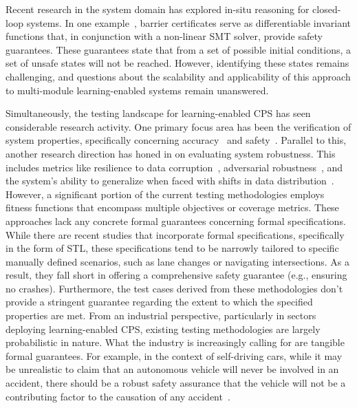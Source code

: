 Recent research in the system domain has explored in-situ reasoning for closed-loop systems. In one example~\cite{tuncali2018reasoning}, barrier certificates serve as differentiable invariant functions that, in conjunction with a non-linear SMT solver, provide safety guarantees. These guarantees state that from a set of possible initial conditions, a set of unsafe states will not be reached. However, identifying these states remains challenging, and questions about the scalability and applicability of this approach to multi-module learning-enabled systems remain unanswered. 

Simultaneously, the testing landscape for learning-enabled CPS has seen considerable research activity. One primary focus area has been the verification of system properties, specifically concerning accuracy~\cite{deng2022declarative} and safety~\cite{tian2022mosat,li2020av}. Parallel to this, another research direction has honed in on evaluating system robustness. This includes metrics like resilience to data corruption~\cite{tian2018deeptest}, adversarial robustness~\cite{deng2020analysis}, and the system's ability to generalize when faced with shifts in data distribution~\cite{cai2020real}.
However, a significant portion of the current testing methodologies employs fitness functions that encompass multiple objectives or coverage metrics. These approaches lack any concrete formal guarantees concerning formal specifications. While there are recent studies \cite{sun2022lawbreaker,zhou2023specification} that incorporate formal specifications, specifically in the form of STL, these specifications tend to be narrowly tailored to specific manually defined scenarios, such as lane changes or navigating intersections. As a result, they fall short in offering a comprehensive safety guarantee (e.g., ensuring no crashes). Furthermore, the test cases derived from these methodologies don't provide a stringent guarantee regarding the extent to which the specified properties are met. From an industrial perspective, particularly in sectors deploying learning-enabled CPS, existing testing methodologies are largely probabilistic in nature. What the industry is increasingly calling for are tangible formal guarantees. For example, in the context of self-driving cars, while it may be unrealistic to claim that an autonomous vehicle will never be involved in an accident, there should be a robust safety assurance that the vehicle will not be a contributing factor to the causation of any accident~\cite{shalev2017formal}.

